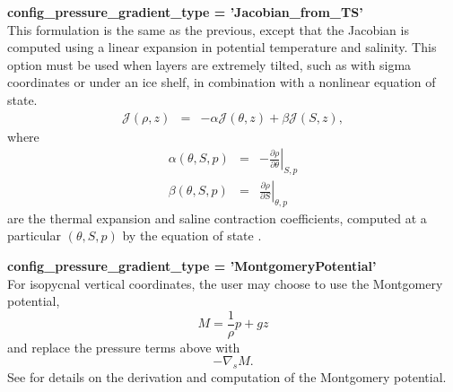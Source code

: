 {\bf \large config\_pressure\_gradient\_type = 'Jacobian\_from\_TS'}\\
This formulation is the same as the previous, except that the Jacobian is computed using a linear expansion in potential temperature and salinity.  This option must be used when layers are extremely tilted, such as with sigma coordinates or under an ice shelf, in combination with a nonlinear equation of state.
\begin{eqnarray}
 {\mathcal J}(\rho,z) &=& -\alpha  {\mathcal J}(\theta,z) + \beta  {\mathcal J}(S,z), 
\end{eqnarray}
where
\begin{eqnarray}
\alpha\left( \theta, S, p\right) &=&  -\left. \frac{\partial \rho}{\partial \theta} \right|_{S,p} \\
\beta\left( \theta, S, p\right) &=&  \left. \frac{\partial \rho}{\partial S} \right|_{\theta,p} 
\end{eqnarray}
are the thermal expansion and saline contraction coefficients, computed at a particular  $\left(\theta, S, p\right)$ by the equation of state \citep[eqn 7.16]{Shchepetkin_McWilliams03jgr}.

{\bf \large config\_pressure\_gradient\_type = 'MontgomeryPotential'}\\
For isopycnal vertical coordinates, the user may choose to use the Montgomery potential,
\begin{equation}
\label{ocean:Montgomery Potential}
M = \frac{1}{\rho}p+gz
\end{equation}
and replace the pressure terms above with
\begin{equation}
- \nabla_s M.
\end{equation}
See \citet[section 2.1]{Higdon05jcp} for details on the derivation and computation of the Montgomery potential.

